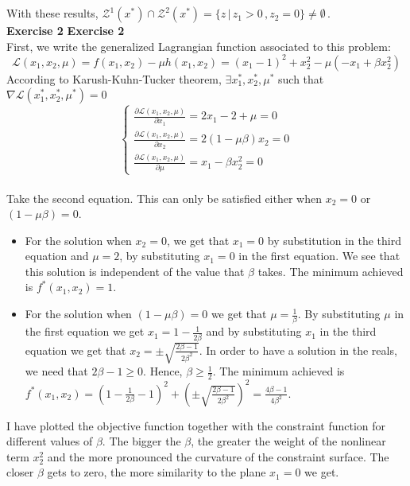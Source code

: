 \documentclass[12pt,letterpaper]{article}
\theoremstyle{definition}
\begin{document}
\\\\With these results, $\mathcal{Z}^1(x^*)\cap \mathcal{Z}^2(x^*) = \{z\,|\, z_1 >0\,, z_2=0\}\neq \emptyset\,.$
\\
\textbf{Exercise 2} 
\textbf{Exercise 2} \\
First, we write the generalized Lagrangian function associated to this problem: 
$$\mathcal{L}(x_1, x_2, \mu) = f(x_1, x_2) -\mu h(x_1,x_2) = (x_1-1)^2+x_2^2-\mu(- x_1 +\beta x_2^2)$$
According to Karush-Kuhn-Tucker theorem, $\exists x_1^*, x_2^*, \mu^*$ such that $\nabla\mathcal{L}(x_1^*, x_2^*, \mu^*)=0$
{\small
\begin{equation*}
    \begin{cases}
    \frac{\partial \mathcal{L}(x_1, x_2, \mu)}{\partial x_1} = 2x_1-2+\mu =  0 \\
     \frac{\partial \mathcal{L}(x_1, x_2, \mu)}{\partial x_2} = 2(1-\mu\beta)x_2 = 0 \\
     \frac{\partial \mathcal{L}(x_1, x_2, \mu)}{\partial \mu} = x_1-\beta x_2^2 = 0
    \end{cases}
\end{equation*}}\\
Take the second equation. This can only be satisfied either when $x_2=0$ or $(1-\mu\beta)=0$. 
\begin{itemize}
    \item For the solution when $x_2=0$, we get that $x_1=0$ by substitution in the third equation and $\mu=2$, by substituting $x_1=0$ in the first equation. We see that this solution is independent of the value that $\beta$ takes. The minimum achieved is $f^*(x_1, x_2) = 1$. 
    \item For the solution when $(1-\mu\beta)=0$ we get that $\mu = \frac{1}{\beta}$. By substituting $\mu$ in the first equation we get $x_1 = 1 -\frac{1}{2\beta}$ and by substituting $x_1$ in the third equation we get that $x_2 = \pm \sqrt{\frac{2\beta-1}{2\beta^2}}$. In order to have a solution in the reals, we need that $2\beta-1\geq0$. Hence, $\beta \geq \frac{1}{2}$. The minimum achieved is $f^*(x_1, x_2) = (1 -\frac{1}{2\beta} - 1)^2 + (\pm \sqrt{\frac{2\beta-1}{2\beta^2}})^2 = \frac{4\beta-1}{4\beta^2} $. 
\end{itemize}
I have plotted the objective function together with the constraint function for different values of $\beta$. The bigger the $\beta$, the greater the weight of the nonlinear term $x_2^2$ and the more pronounced the curvature of the constraint surface. The closer $\beta$ gets to zero, the more similarity to the plane $x_1 = 0$ we get.\\
\end{document}
